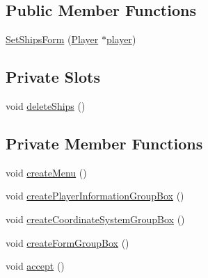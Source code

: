 \subsection*{Public Member Functions}
\begin{DoxyCompactItemize}
\item 
\hyperlink{classSetShipsForm_a5d8d0b3ae99ed33ab7f86da618853892}{Set\+Ships\+Form} (\hyperlink{classPlayer}{Player} $\ast$\hyperlink{classSetShipsForm_a96781128d3743da3d17e0fdd91afba7b}{player})
\end{DoxyCompactItemize}
\subsection*{Private Slots}
\begin{DoxyCompactItemize}
\item 
void \hyperlink{classSetShipsForm_a9a5bd99aaa8c0771d6d667c0b4236b22}{delete\+Ships} ()
\end{DoxyCompactItemize}
\subsection*{Private Member Functions}
\begin{DoxyCompactItemize}
\item 
void \hyperlink{classSetShipsForm_a84e8aba32191c603553509d5248ee4b5}{create\+Menu} ()
\item 
void \hyperlink{classSetShipsForm_a497d3ad24737683529f9f87b98fd3b67}{create\+Player\+Information\+Group\+Box} ()
\item 
void \hyperlink{classSetShipsForm_a94aecc37ca7712b0e59f69d353bcc84e}{create\+Coordinate\+System\+Group\+Box} ()
\item 
void \hyperlink{classSetShipsForm_a3f341efc111e193ae9b69e107f994e1e}{create\+Form\+Group\+Box} ()
\item 
void \hyperlink{classSetShipsForm_aadb9f3b844fb4cf98288cd3c60a3af91}{accept} ()
\end{DoxyCompactItemize}
